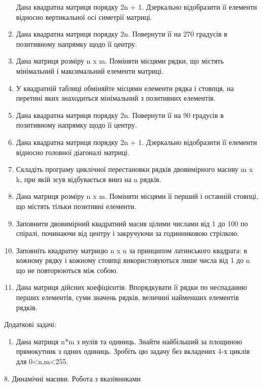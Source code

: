 \documentclass[]{article}
\begin{document}
\begin{enumerate}
  Дана квадратна матриця порядку 2n + 1. Дзеркально відобразити її
  елементи відносно вертикальної осі симетрії матриці.
\item
  Дана квадратна матриця порядку 2n. Повернути її на 270 градусів в
  позитивному напрямку щодо її центру.
\item
  Дана матриця розміру n x m. Поміняти місцями рядки, що містять
  мінімальний і максимальний елементи матриці.
\item
  У квадратній таблиці обміняйте місцями елементи рядка і стовпця, на
  перетині яких знаходиться мінімальний з позитивних елементів.
\item
  Дана квадратна матриця порядку 2n. Повернути її на 90 градусів в
  позитивному напрямку щодо її центру.
\item
  Дана квадратна матриця порядку 2n + 1. Дзеркально відобразити її
  елементи відносно головної діагоналі матриці.
\item
  Складіть програму циклічної перестановки рядків двовимірного масиву m
  x k, при якій зсув відбувається вниз на n рядків.
\item
  Дана матриця розміру n x m. Поміняти місцями її перший і останній
  стовпці, що містять тільки позитивні елементи.
\item
  Заповнити двовимірний квадратний масив цілими числами від 1 до 100 по
  спіралі, починаючи від центру і закручуючи за годинниковою стрілкою.
\item
  Заповніть квадратну матрицю n x n за принципом латинського квадрата: в
  кожному рядку і кожному стовпці використовуються лише числа від 1 до n
  що не повторюються між собою.
\item
  Дана матриця дійсних коефіцієнтів. Впорядкувати її рядки по неспаданню
  перших елементів, суми значень рядків, величині найменших елементів
  рядків.
\end{enumerate}

Додаткові задачі:

\begin{enumerate}
\def\labelenumi{\arabic{enumi})}
\item
  Дана матриця n*m з нулів та одиниць. Знайти найбільший за площиною
  прямокутник з одних одиниць. Зробіть цю задачу без вкладених 4-х
  циклів для 0\textless{}n,m\textless{}255.
\end{enumerate}

8. Динамічні масиви. Робота з вказівниками
\end{document}
